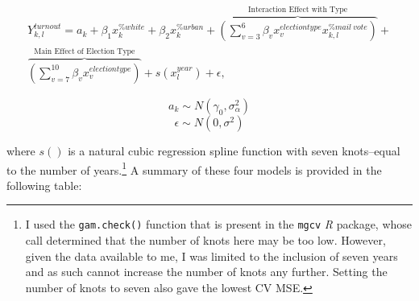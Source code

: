 \documentclass[]{article}
\let\rmarkdownfootnote\footnote%
\def\footnote{\protect\rmarkdownfootnote}
\begin{document}
\begin{multline}\tag{Model 4}
Y^{turnout}_{k,l} = a_{k} + \beta_{1}x_k^{\% white} + \beta_{2}x_k^{\% urban} + \overbrace{(\sum_{v=3}^{6}\beta_{v}x_{v}^{election type} x_{k,l}^{\% mail~vote})}^\text{Interaction Effect with Type} + \\ \overbrace{(\sum_{v=7}^{10}\beta_{v}x_{v}^{election type})}^\text{Main Effect of Election Type} + s(x^{year}_{l}) + \epsilon,
\end{multline}

\[a_{k} \sim N(\gamma_0, \sigma_{\alpha}^2)\]
\[\epsilon \sim N(0, \sigma^2)\]

where \(s()\) is a natural cubic regression spline function with seven
knots--equal to the number of years.\footnote{I used the
  \texttt{gam.check()} function that is present in the \texttt{mgcv}
  \textit{R} package, whose call determined that the number of knots
  here may be too low. However, given the data available to me, I was
  limited to the inclusion of seven years and as such cannot increase
  the number of knots any further. Setting the number of knots to seven
  also gave the lowest CV MSE.} A summary of these four models is
provided in the following table:
\end{document}
